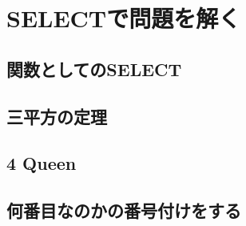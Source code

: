 \chapter{SELECTで問題を解く}

\section{関数としてのSELECT}

\section{三平方の定理}

\section{4 Queen}

\section{何番目なのかの番号付けをする}